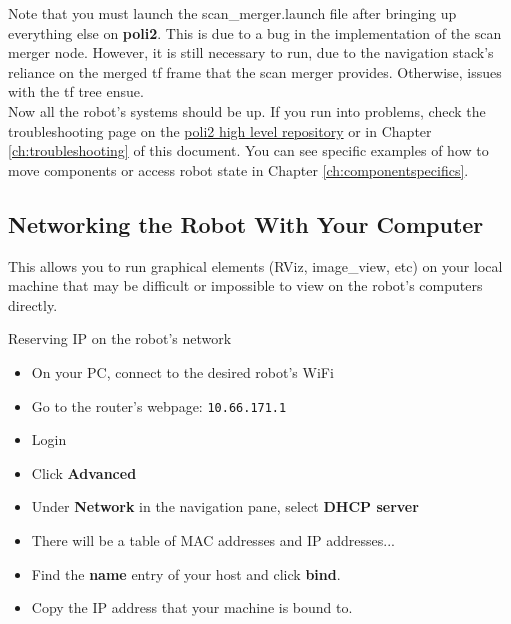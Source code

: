 Note that you must launch the scan\_merger.launch file after bringing up everything else on \textbf{poli2}. 
This is due to a bug in the implementation of the scan merger node. 
However, it is still necessary to run, due to the navigation stack's reliance on the merged tf frame that the scan merger provides. Otherwise, issues with the tf tree ensue. \\

Now all the robot's systems should be up. If you run into problems, check the troubleshooting page on the \href{https://github.com/si-machines/poli2/wiki}{poli2 high level repository} or in Chapter \ref{ch:troubleshooting} of this document. You can see specific examples of how to move components or access robot state in Chapter \ref{ch:componentspecifics}.

\subsection{Networking the Robot With Your Computer}
This allows you to run graphical elements (RViz, image\_view, etc) on your local machine that may be difficult or impossible to view on the robot's computers directly. \\

\begin{example}{Reserving IP on the robot's network} \label{ex:reserve_ip}
\begin{itemize}
  \item On your PC, connect to the desired robot's WiFi
  \item Go to the router's webpage: \texttt{10.66.171.1}
  \item Login
  \item Click \textbf{Advanced}
  \item Under \textbf{Network} in the navigation pane, select \textbf{DHCP server}
  \item There will be a table of MAC addresses and IP addresses...
  \item Find the \textbf{name} entry of your host and click \textbf{bind}.
  \item Copy the IP address that your machine is bound to.
\end{itemize}
\end{example}

